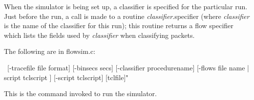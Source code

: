 \documentclass{article}
\begin{document}
When the simulator is being set up, a classifier is specified for the
particular run.  Just before the run, a call is made to a routine
\emph{classifier}.specifier (where \emph{classifier} is the name of the
classifier for this run); this routine returns a flow specifier which
lists the fields used by \emph{classifier} when classifying packets.

The following are in flowsim.c:

\clearpage
{}
\label{sec:flowsim}

\SYNOPSIS \cmdname\ [-tracefile file format] [-binsecs secs]
[-classifier procedurename] [-flows { file name | script tclscript }]
[-script tclscript] [tclfile]"

\DESCRIPTION

This is the command invoked to run the simulator.
\end{document}
